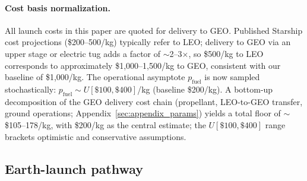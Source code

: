 \documentclass[preprint,12pt]{elsarticle}
\begin{document}
\paragraph{Cost basis normalization.} All launch costs in this paper are quoted for delivery to GEO. Published Starship cost projections (\$200--500/kg) typically refer to LEO; delivery to GEO via an upper stage or electric tug adds a factor of $\sim$2--3$\times$, so \$500/kg to LEO corresponds to approximately \$1,000--1,500/kg to GEO, consistent with our baseline of \$1,000/kg. The operational asymptote $p_{\mathrm{fuel}}$ is now sampled stochastically: $p_{\mathrm{fuel}} \sim U[\$100, \$400]$/kg (baseline \$200/kg). A bottom-up decomposition of the GEO delivery cost chain (propellant, LEO-to-GEO transfer, ground operations; Appendix~\ref{sec:appendix_params}) yields a total floor of $\sim$\$105--178/kg, with \$200/kg as the central estimate; the $U[\$100, \$400]$ range brackets optimistic and conservative assumptions.

\subsection{Earth-launch pathway}
\end{document}
